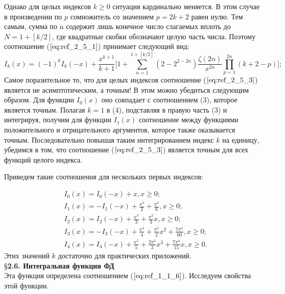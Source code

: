 Однако для целых индексов $k \geqslant 0$ ситуация кардинально меняется. В этом
случае в произведении по $p$ сомножитель со значением $p = 2k + 2$ равен нулю.
Тем самым, сумма по n содержит лишь конечное число слагаемых вплоть до
$N=1+[k/2]$, где квадратные скобки обозначают целую часть числа. Поэтому
соотношение ($\ref{eq:ref_2_5_1}$) принимает следующий вид:
\begin{equation}
I_k(x) = (-1)^k I_k(-x)+ \frac{x^{k+1}}{k+1}\Bigg[ 1+\sum\limits_{n=1}^{1+[k/2]} (2-2^{2-2n}) \frac{\zeta (2n)}{x^{2n}}  \prod\limits_{p=1}^{2n} (k+2-p) \Bigg];
\label{eq:ref_2_5_3}
\end{equation}
Самое поразительное то, что для целых индексов соотношение ($\ref{eq:ref_2_5_3}$) является не
асимптотическим, а точным! В этом можно убедиться следующим образом. Для
функции $I_0(x)$ оно совпадает с соотношением (3), которое является точным.
Полагая $k=1$ в (4), подставляя в правую часть (3) и интегрируя, получим для
функции $I_1(x)$ соотношение между функциями положительного и
отрицательного аргументов, которое также оказывается точным.
Последовательно повышая таким интегрированием индекс $k$ на единицу,
убедимся в том, что соотношение ($\ref{eq:ref_2_5_3}$) является точным для всех функций
целого индекса.

Приведем такие соотношения для нескольких первых индексов:

\begin{equation}
\begin{aligned}
&I_0(x)=I_0(-x)+x,x \geqslant 0; \\
&I_1(x)=-I_1(-x)+\frac{x^2}{2} + \frac{\pi^2}{6},x \geqslant 0;\\
&I_2(x)=I_2(-x)+\frac{x^3}{3} + \frac{\pi^2}{3}x,x \geqslant 0;\\
&I_3(x)=-I_3(-x)+\frac{x^4}{4} + \frac{\pi^2}{2}x^2 + \frac{7\pi^4}{60},x \geqslant 0;\\
&I_4(x)=I_4(-x)+\frac{x^5}{5} + \frac{2\pi^2}{3}x^3 + \frac{7\pi^4}{15}x,x \geqslant 0.
\end{aligned}
\label{eq:ref_2_5_4}
\end{equation}
Этих значений $k$ достаточно для практических приложений.
\\

\S \textbf{2.6. Интегральная функция ФД}
\\

Эта функция определена соотношением ($\ref{eq:ref_1_1_6}$). Исследуем свойства этой функции.


